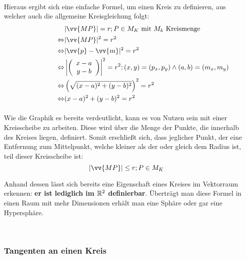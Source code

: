         \paragraph{} Hieraus ergibt sich eine einfache Formel, um einen Kreis zu definieren, aus welcher auch die allgemeine Kreisgleichung folgt:
        \\
        \begin{align*}
            \qquad \qquad \qquad &|\vv{MP}| = r ; P \in M_K \text{ mit $M_k$ Kreismenge} \\
                 \Leftrightarrow &|\vv{MP}|^2 = r^2 \\
                 \Leftrightarrow &|\vv{p} - \vv{m}|^2 = r^2 \\
                 \Leftrightarrow &\left|\left(\begin{array}{c} x - a \\ y - b\end{array}\right)\right|^2 = r^2 ; (x,y) = (p_x,p_y) \land (a,b) = (m_x,m_y) \\
                 \Leftrightarrow &\left(\sqrt{(x - a)^2 + (y - b)^2}\right)^2 = r^2 \\
                 \Leftrightarrow &(x - a)^2 + (y - b)^2 = r^2 \\
        \end{align*}
        \paragraph{} Wie die Graphik es bereits verdeutlicht, kann es von Nutzen sein mit einer Kreisscheibe zu arbeiten. Diese wird über die Menge der Punkte, die innerhalb des Kreises liegen, definiert.
        Somit erschließt sich, dass jeglicher Punkt, der eine Entfernung zum Mittelpunkt, welche kleiner als der oder gleich dem Radius ist, teil dieser Kreisscheibe ist:
                                                    $$|\vv{MP}| \leq r ; P \in M_K$$

        \begin{Bemerkung}
            Anhand dessen lässt sich bereits eine Eigenschaft eines Kreises im Vektorraum erkennen: \textbf{er ist lediglich im $\mathbb{R}^2$ definierbar}. Überträgt man diese Formel in einen Raum mit mehr Dimensionen erhält man eine Sphäre oder gar eine Hypersphäre.
        \end{Bemerkung}

        \\
        \subsubsection{Tangenten an einen Kreis}

